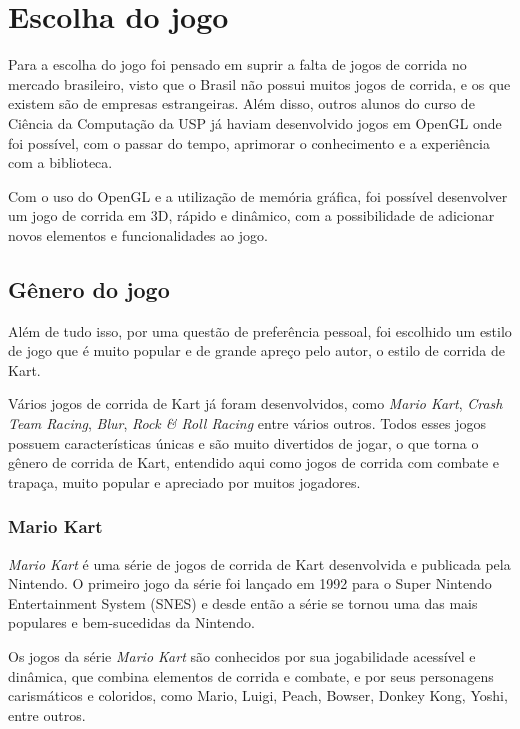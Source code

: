 \chapter{Escolha do jogo}

Para a escolha do jogo foi pensado em suprir a falta de jogos de corrida no mercado brasileiro, visto que o Brasil não possui muitos jogos de corrida, e os que existem são de empresas estrangeiras. Além disso, outros alunos do curso de Ciência da Computação da USP já haviam desenvolvido jogos em OpenGL onde foi possível, com o passar do tempo, aprimorar o conhecimento e a experiência com a biblioteca.

Com o uso do OpenGL e a utilização de memória gráfica, foi possível desenvolver um jogo de corrida em 3D, rápido e dinâmico, com a possibilidade de adicionar novos elementos e funcionalidades ao jogo.

\section{Gênero do jogo}

Além de tudo isso, por uma questão de preferência pessoal, foi escolhido um estilo de jogo que é muito popular e de grande apreço pelo autor, o estilo de corrida de Kart.

Vários jogos de corrida de Kart já foram desenvolvidos, como \textit{Mario Kart}, \textit{Crash Team Racing}, \textit{Blur}, \textit{Rock \& Roll Racing} entre vários outros. Todos esses jogos possuem características únicas e são muito divertidos de jogar, o que torna o gênero de corrida de Kart, entendido aqui como jogos de corrida com combate e trapaça, muito popular e apreciado por muitos jogadores.

\subsection{Mario Kart}

\textit{Mario Kart} é uma série de jogos de corrida de Kart desenvolvida e publicada pela Nintendo. O primeiro jogo da série foi lançado em 1992 para o Super Nintendo Entertainment System (SNES) e desde então a série se tornou uma das mais populares e bem-sucedidas da Nintendo.

Os jogos da série \textit{Mario Kart} são conhecidos por sua jogabilidade acessível e dinâmica, que combina elementos de corrida e combate, e por seus personagens carismáticos e coloridos, como Mario, Luigi, Peach, Bowser, Donkey Kong, Yoshi, entre outros.

